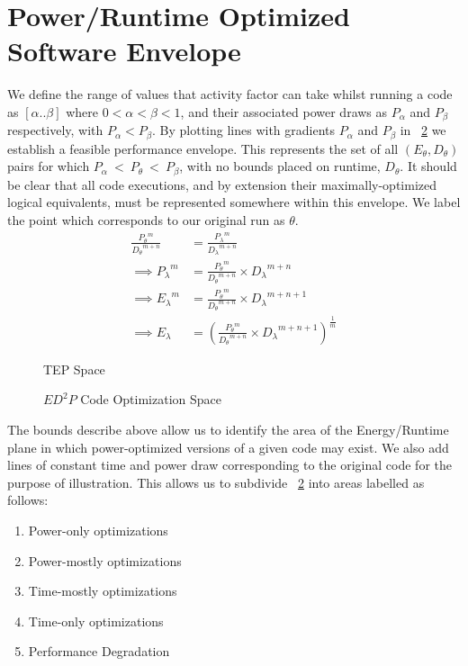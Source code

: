 \section{Power/Runtime Optimized Software Envelope}
We define the range of values that activity factor can take whilst running a code as $[\alpha  .. \beta]$ where $0 < \alpha < \beta < 1$, and their associated power draws as $P_{\alpha}$ and $P_{\beta}$ respectively, with $P_{\alpha} < P_{\beta}$. By plotting lines with gradients $P_{\alpha}$ and $P_{\beta}$ in \figurename~\ref{fig:modeldraw} we establish a feasible performance envelope. This represents the set of all $(E_\theta, D_\theta)$ pairs for which $P_{\alpha}~<~P_\theta~<~P_{\beta}$, with no bounds placed on runtime, $D_\theta$. It should be clear that all code executions, and by extension their maximally-optimized logical equivalents, must be represented somewhere within this envelope. We label the point which corresponds to our original run as $\theta$.
\begin{align}
\frac{{P_{\theta}}^m}{{D_{\theta}}^{m+n}} &= \frac{{P_{\lambda}}^m}{{D_{\lambda}}^{m+n}} \nonumber \\
\implies {P_{\lambda}}^m &= \frac{{P_{\theta}}^m}{{D_{\theta}}^{m+n}} \times {D_\lambda}^{m+n} \nonumber \\ 
\implies {E_{\lambda}}^m &= \frac{{P_{\theta}}^m}{{D_{\theta}}^{m+n}} \times {D_\lambda}^{m+n+1} \nonumber \\ 
\implies E_{\lambda} &= (\frac{{P_{\theta}}^m}{{D_{\theta}}^{m+n}} \times {D_\lambda}^{m+n+1})^{\frac{1}{m}} 
\end{align}

\begin{figure}
\centering

\caption{TEP Space}
\label{fig:modeldraw}
\end{figure}

\begin{figure}
\centering

\caption{$ED^2P$ Code Optimization Space}
\label{fig:modeldraw}
\end{figure}
The bounds describe above allow us to identify the area of the Energy/Runtime plane in which power-optimized versions of a given code may exist. We also add lines of constant time and power draw corresponding to the original code for the purpose of illustration. This allows us to subdivide \figurename~\ref{fig:modeldraw} into areas labelled as follows:
\begin{enumerate}
\item Power-only optimizations
\item Power-mostly optimizations
\item Time-mostly optimizations
\item Time-only optimizations
\item Performance Degradation
\end{enumerate}
